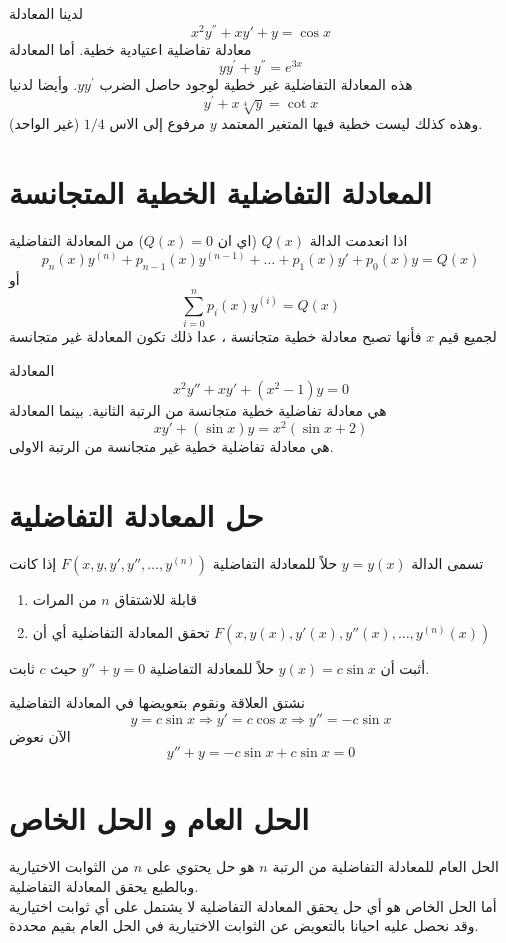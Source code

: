 \begin{example}
    لدينا المعادلة
    \[
    x^2y^{''}+xy'+y=\cos x
    \]
    معادلة تفاضلية اعتيادية خطية. أما المعادلة
    \[
    yy^{'}+y^{''}=e^{3x}
    \]
    هذه المعادلة التفاضلية غير خطية لوجود حاصل الضرب $yy^{'}$. وأيضا لدنيا
\[
y^{'}+x\sqrt[4]{y}=\cot x
\]
وهذه كذلك ليست خطية فيها المتغير المعتمد $y$ مرفوع إلى الاس $1/4$ (غير الواحد).
\end{example}

\section[المعادلة التفاضلية الخطية المتجانسة]{المعادلة التفاضلية الخطية المتجانسة}
اذا انعدمت الدالة $Q(x)$ (اي ان $Q(x) = 0$) من المعادلة التفاضلية
\[
p_n(x)y^{(n)}+p_{n-1}(x)y^{(n-1)}+\dots+p_1(x)y'+p_0(x)y=Q(x)
\]
أو
\[
\sum_{i=0}^{n}p_i(x)y^{(i)}=Q(x)
\]
لجميع قيم $x$ فأنها تصبح معادلة خطية متجانسة ، عدا ذلك تكون المعادلة غير متجانسة

\begin{example}
	المعادلة
	\[
	x^2 y'' + xy' + (x^2 - 1)y = 0
	\]
	هي معادلة تفاضلية خطية متجانسة من الرتبة الثانية. بينما المعادلة
	\[
	xy' + (\sin x)y = x^2(\sin x + 2)
	\] 
	هي معادلة تفاضلية خطية غير متجانسة من الرتبة الاولى.
\end{example}

\section[حل المعادلة التفاضلية]{حل المعادلة التفاضلية}
تسمى الدالة $y=y(x)$ حلاً للمعادلة التفاضلية $F(x,y,y',y'',\dots,y^{(n)})$ إذا كانت
\begin{enumerate}
    \item قابلة للاشتقاق $n$ من المرات
    \item تحقق المعادلة التفاضلية أي أن $F(x,y(x),y'(x),y''(x),\dots,y^{(n)}(x))$
\end{enumerate}
\begin{example}
    أثبت أن $y(x)=c \sin x$ حلاً للمعادلة التفاضلية $y''+y=0$ حيث $c$ ثابت.
\end{example}
\begin{solution}
    نشتق العلاقة ونقوم بتعويضها في المعادلة التفاضلية
\[
y=c\sin x\Rightarrow y'=c\cos x\Rightarrow y''=-c\sin x
\]
الآن نعوض
\[
y''+y=-c\sin x+c\sin x=0
\]
\end{solution}
\section[الحل العام و الحل الخاص]{الحل العام و الحل الخاص}
الحل العام للمعادلة التفاضلية من الرتبة $n$ هو حل يحتوي على $n$ من الثوابت الاختيارية وبالطبع يحقق المعادلة التفاضلية.\\
أما الحل الخاص هو أي حل يحقق المعادلة التفاضلية لا يشتمل على أي ثوابت اختيارية وقد نحصل عليه احيانا بالتعويض عن الثوابت الاختيارية في الحل العام بقيم محددة.

